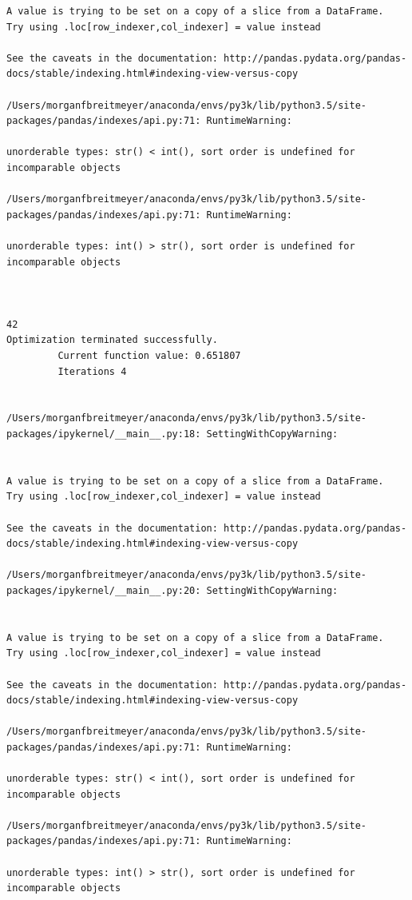 \begin{lstlisting}
A value is trying to be set on a copy of a slice from a DataFrame.
Try using .loc[row_indexer,col_indexer] = value instead

See the caveats in the documentation: http://pandas.pydata.org/pandas-docs/stable/indexing.html#indexing-view-versus-copy

/Users/morganfbreitmeyer/anaconda/envs/py3k/lib/python3.5/site-packages/pandas/indexes/api.py:71: RuntimeWarning:

unorderable types: str() < int(), sort order is undefined for incomparable objects

/Users/morganfbreitmeyer/anaconda/envs/py3k/lib/python3.5/site-packages/pandas/indexes/api.py:71: RuntimeWarning:

unorderable types: int() > str(), sort order is undefined for incomparable objects



42
Optimization terminated successfully.
         Current function value: 0.651807
         Iterations 4


/Users/morganfbreitmeyer/anaconda/envs/py3k/lib/python3.5/site-packages/ipykernel/__main__.py:18: SettingWithCopyWarning:


A value is trying to be set on a copy of a slice from a DataFrame.
Try using .loc[row_indexer,col_indexer] = value instead

See the caveats in the documentation: http://pandas.pydata.org/pandas-docs/stable/indexing.html#indexing-view-versus-copy

/Users/morganfbreitmeyer/anaconda/envs/py3k/lib/python3.5/site-packages/ipykernel/__main__.py:20: SettingWithCopyWarning:


A value is trying to be set on a copy of a slice from a DataFrame.
Try using .loc[row_indexer,col_indexer] = value instead

See the caveats in the documentation: http://pandas.pydata.org/pandas-docs/stable/indexing.html#indexing-view-versus-copy

/Users/morganfbreitmeyer/anaconda/envs/py3k/lib/python3.5/site-packages/pandas/indexes/api.py:71: RuntimeWarning:

unorderable types: str() < int(), sort order is undefined for incomparable objects

/Users/morganfbreitmeyer/anaconda/envs/py3k/lib/python3.5/site-packages/pandas/indexes/api.py:71: RuntimeWarning:

unorderable types: int() > str(), sort order is undefined for incomparable objects




\end{lstlisting}
